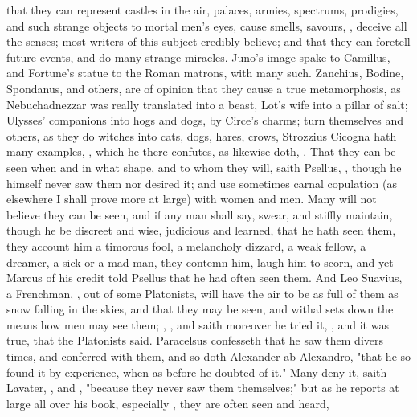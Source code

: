 that they can represent castles in the air, palaces, armies, spectrums,
prodigies, and such strange objects to mortal men's eyes,
cause smells, savours, \etc{}, deceive all the senses;
most writers of this subject credibly believe; and that they can foretell
future events, and do many strange miracles. Juno's image spake to Camillus,
and Fortune's statue to the Roman matrons, with many such. Zanchius, Bodine,
Spondanus, and others, are of opinion that they cause a true metamorphosis, as
Nebuchadnezzar was really translated into a beast, Lot's wife into a pillar of
salt; Ulysses' companions into hogs and dogs, by Circe's charms; turn
themselves and others, as they do witches into cats, dogs, hares, crows, \etc{}
Strozzius Cicogna hath many examples, , which he there confutes, as \Austin{} likewise doth,
. That they can be seen when and
in what shape, and to whom they will, saith Psellus, , though he himself never saw them nor desired it;
and use sometimes carnal copulation (as elsewhere I shall
prove more at large) with women and men. Many will not
believe they can be seen, and if any man shall say, swear, and stiffly
maintain, though he be discreet and wise, judicious and learned, that he hath
seen them, they account him a timorous fool, a melancholy dizzard, a weak
fellow, a dreamer, a sick or a mad man, they contemn him, laugh him to scorn,
and yet Marcus of his credit told Psellus that he had often seen them. And Leo
Suavius, a Frenchman, , out of some Platonists, will have the air to be as full of
them as snow falling in the skies, and that they may be seen, and withal sets
down the means how men may see them; ,
\etc{}, and saith moreover he tried it, ,
and it was true, that the Platonists said. Paracelsus confesseth that he saw
them divers times, and conferred with them, and so doth Alexander ab
Alexandro, "that he so found it by experience, when as
before he doubted of it." Many deny it, saith Lavater, , and , "because
they never saw them themselves;" but as he reports at large all over his book,
especially , they are often seen and heard,
